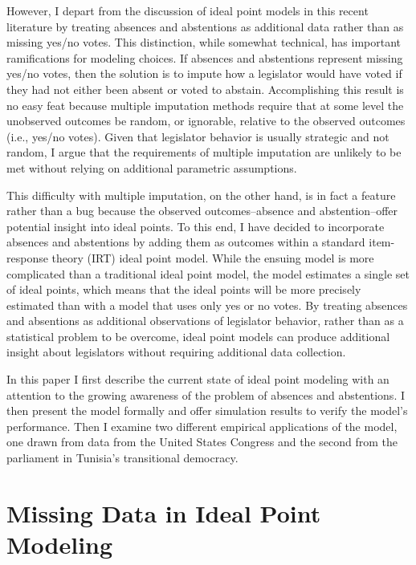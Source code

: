 	However, I depart from the discussion of ideal point models in this recent literature by treating absences and abstentions as additional data rather than as missing yes/no votes. This distinction, while somewhat technical, has important ramifications for modeling choices. If absences and abstentions represent missing yes/no votes, then the solution is to impute how a legislator would have voted if they had not either been absent or voted to abstain. Accomplishing this result is no easy feat because multiple imputation methods require that at some level the unobserved outcomes be random, or ignorable, relative to the observed outcomes (i.e., yes/no votes). Given that legislator behavior is usually strategic and not random, I argue that the requirements of multiple imputation are unlikely to be met without relying on additional parametric assumptions. 
	
	This difficulty with multiple imputation, on the other hand, is in fact a feature rather than a bug because the observed outcomes--absence and abstention--offer potential insight into ideal points. To this end, I have decided to incorporate absences and abstentions by adding them as outcomes within a standard item-response theory (IRT) ideal point model. While the ensuing model is more complicated than a traditional ideal point model, the model estimates a single set of ideal points, which means that the ideal points will be more precisely estimated than with a model that uses only yes or no votes. By treating absences and absentions as additional observations of legislator behavior, rather than as a statistical problem to be overcome, ideal point models can produce additional insight about legislators without requiring additional data collection.
	
	In this paper I first describe the current state of ideal point modeling with an attention to the growing awareness of the problem of absences and abstentions. I then present the model formally and offer simulation results to verify the model's performance. Then I examine two different empirical applications of the model, one drawn from data from the United States Congress and the second from the parliament in Tunisia's transitional democracy.
	
	\section*{Missing Data in Ideal Point Modeling}
	

